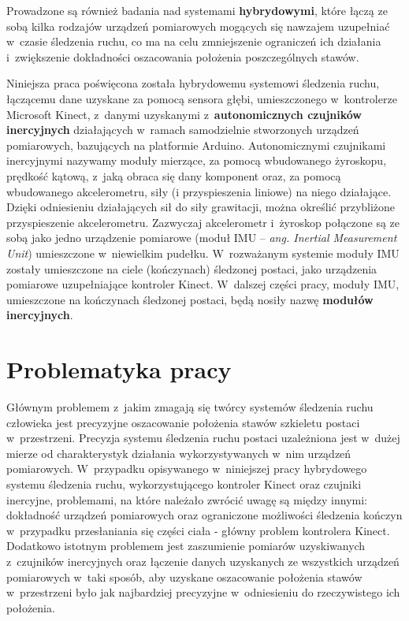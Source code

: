 Prowadzone są również badania nad systemami \textbf{hybrydowymi}, które łączą ze sobą kilka rodzajów urządzeń pomiarowych mogących się nawzajem uzupełniać w~czasie śledzenia ruchu, co ma na celu zmniejszenie ograniczeń ich działania i~zwiększenie dokładności oszacowania położenia poszczególnych stawów.

Niniejsza praca poświęcona została hybrydowemu systemowi śledzenia ruchu, łączącemu dane uzyskane za pomocą sensora głębi, umieszczonego w~kontrolerze Microsoft Kinect, z~danymi uzyskanymi z~\textbf{autonomicznych czujników inercyjnych} działających w~ramach samodzielnie stworzonych urządzeń pomiarowych, bazujących na platformie Arduino. Autonomicznymi czujnikami inercyjnymi nazywamy moduły mierzące, za pomocą wbudowanego żyroskopu, prędkość kątową, z~jaką obraca się dany komponent oraz, za pomocą wbudowanego akcelerometru, siły (i przyspieszenia liniowe) na niego działające. Dzięki odniesieniu działających sił do siły grawitacji, można określić przybliżone przyspieszenie akcelerometru. Zazwyczaj akcelerometr i~żyroskop połączone są ze sobą jako jedno urządzenie pomiarowe (moduł IMU -- \emph{ang. Inertial Measurement Unit}) umieszczone w~niewielkim pudełku. W~rozważanym systemie moduły IMU zostały umieszczone na ciele (kończynach) śledzonej postaci, jako urządzenia pomiarowe uzupełniające kontroler Kinect. W~dalszej części pracy, moduły IMU, umieszczone na kończynach śledzonej postaci, będą nosiły nazwę \textbf{modułów inercyjnych}.

\section{Problematyka pracy}
Głównym problemem z~jakim zmagają się twórcy systemów śledzenia ruchu człowieka jest precyzyjne oszacowanie położenia stawów szkieletu postaci w~przestrzeni. Precyzja systemu śledzenia ruchu postaci uzależniona jest w~dużej mierze od charakterystyk działania wykorzystywanych w~nim urządzeń pomiarowych. W~przypadku opisywanego w~niniejszej pracy hybrydowego systemu śledzenia ruchu, wykorzystującego kontroler Kinect oraz czujniki inercyjne, problemami, na które należało zwrócić uwagę są między innymi: dokładność urządzeń pomiarowych oraz ograniczone możliwości śledzenia kończyn w~przypadku przesłaniania się części ciała - główny problem kontrolera Kinect. Dodatkowo istotnym problemem jest zaszumienie pomiarów uzyskiwanych z~czujników inercyjnych oraz łączenie danych uzyskanych ze wszystkich urządzeń pomiarowych w~taki sposób, aby uzyskane oszacowanie położenia stawów w~przestrzeni było jak najbardziej precyzyjne w~odniesieniu do rzeczywistego ich położenia.

